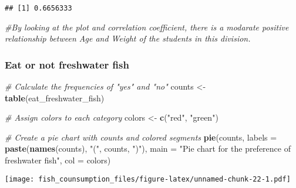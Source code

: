 \documentclass[
]{article}
\newenvironment{Shaded}{\begin{snugshade}}{\end{snugshade}}
\newcommand{\AttributeTok}[1]{\textcolor[rgb]{0.13,0.29,0.53}{#1}}
\newcommand{\CommentTok}[1]{\textcolor[rgb]{0.56,0.35,0.01}{\textit{#1}}}
\newcommand{\FunctionTok}[1]{\textcolor[rgb]{0.13,0.29,0.53}{\textbf{#1}}}
\newcommand{\NormalTok}[1]{#1}
\newcommand{\OtherTok}[1]{\textcolor[rgb]{0.56,0.35,0.01}{#1}}
\newcommand{\SpecialCharTok}[1]{\textcolor[rgb]{0.81,0.36,0.00}{\textbf{#1}}}
\newcommand{\StringTok}[1]{\textcolor[rgb]{0.31,0.60,0.02}{#1}}
\begin{document}
\begin{Shaded}
\end{Shaded}

\begin{verbatim}
## [1] 0.6656333
\end{verbatim}

\begin{Shaded}
\begin{Highlighting}[]
\CommentTok{\#By looking at the plot and correlation coefficient, there is a modarate positive relationship between Age and Weight of the students in this division. }
\end{Highlighting}
\end{Shaded}

\hypertarget{eat-or-not-freshwater-fish}{%
\subsubsection{Eat or not freshwater
fish}\label{eat-or-not-freshwater-fish}}

\begin{Shaded}
\begin{Highlighting}[]
\CommentTok{\# Calculate the frequencies of "yes" and "no"}
\NormalTok{counts }\OtherTok{\textless{}{-}} \FunctionTok{table}\NormalTok{(eat\_freshwater\_fish)}

\CommentTok{\# Assign colors to each category}
\NormalTok{colors }\OtherTok{\textless{}{-}} \FunctionTok{c}\NormalTok{(}\StringTok{"red"}\NormalTok{, }\StringTok{"green"}\NormalTok{)}

\CommentTok{\# Create a pie chart with counts and colored segments}
\FunctionTok{pie}\NormalTok{(counts, }\AttributeTok{labels =} \FunctionTok{paste}\NormalTok{(}\FunctionTok{names}\NormalTok{(counts), }\StringTok{"("}\NormalTok{, counts, }\StringTok{")"}\NormalTok{), }
    \AttributeTok{main =} \StringTok{"Pie chart for the preference of freshwater fish"}\NormalTok{, }\AttributeTok{col =}\NormalTok{ colors)}
\end{Highlighting}
\end{Shaded}

\texttt{[image: fish\_counsumption\_files/figure-latex/unnamed-chunk-22-1.pdf]}
\end{document}
